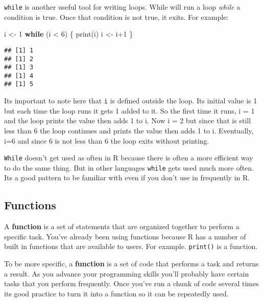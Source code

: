 \documentclass[
]{article}
\newenvironment{Shaded}{\begin{snugshade}}{\end{snugshade}}
\newcommand{\ControlFlowTok}[1]{\textcolor[rgb]{0.13,0.29,0.53}{\textbf{#1}}}
\newcommand{\DecValTok}[1]{\textcolor[rgb]{0.00,0.00,0.81}{#1}}
\newcommand{\FunctionTok}[1]{\textcolor[rgb]{0.00,0.00,0.00}{#1}}
\newcommand{\NormalTok}[1]{#1}
\newcommand{\OtherTok}[1]{\textcolor[rgb]{0.56,0.35,0.01}{#1}}
\newcommand{\SpecialCharTok}[1]{\textcolor[rgb]{0.00,0.00,0.00}{#1}}
\begin{document}
\texttt{while} is another useful tool for writing loops. While will run
a loop \emph{while} a condition is true. Once that condition is not
true, it exits. For example:

\begin{Shaded}
\begin{Highlighting}[]
\NormalTok{i }\OtherTok{\textless{}{-}} \DecValTok{1}
\ControlFlowTok{while}\NormalTok{ (i }\SpecialCharTok{\textless{}} \DecValTok{6}\NormalTok{) \{}
  \FunctionTok{print}\NormalTok{(i)}
\NormalTok{  i }\OtherTok{\textless{}{-}}\NormalTok{ i}\SpecialCharTok{+}\DecValTok{1}
\NormalTok{\}}
\end{Highlighting}
\end{Shaded}

\begin{verbatim}
## [1] 1
## [1] 2
## [1] 3
## [1] 4
## [1] 5
\end{verbatim}

Its important to note here that \texttt{i} is defined outside the loop.
Its initial value is 1 but each time the loop runs it gets 1 added to
it. So the first time it runs, i = 1 and the loop prints the value then
adds 1 to i. Now i = 2 but since that is still less than 6 the loop
continues and prints the value then adds 1 to i. Eventually, i=6 and
since 6 is not less than 6 the loop exits without printing.

\texttt{While} doesn't get used as often in R because there is often a
more efficient way to do the same thing. But in other languages
\texttt{while} gets used much more often. Its a good pattern to be
familiar with even if you don't use in frequently in R.

\hypertarget{functions}{%
\subsection{Functions}\label{functions}}

A \textbf{function} is a set of statements that are organized together
to perform a specific task. You've already been using functions because
R has a number of built in functions that are available to users. For
example. \texttt{print()} is a function.

To be more specific, a \textbf{function} is a set of code that performs
a task and returns a result. As you advance your programming skills
you'll probably have certain tasks that you perform frequently. Once
you've run a chunk of code several times its good practice to turn it
into a function so it can be repeatedly used.
\end{document}
